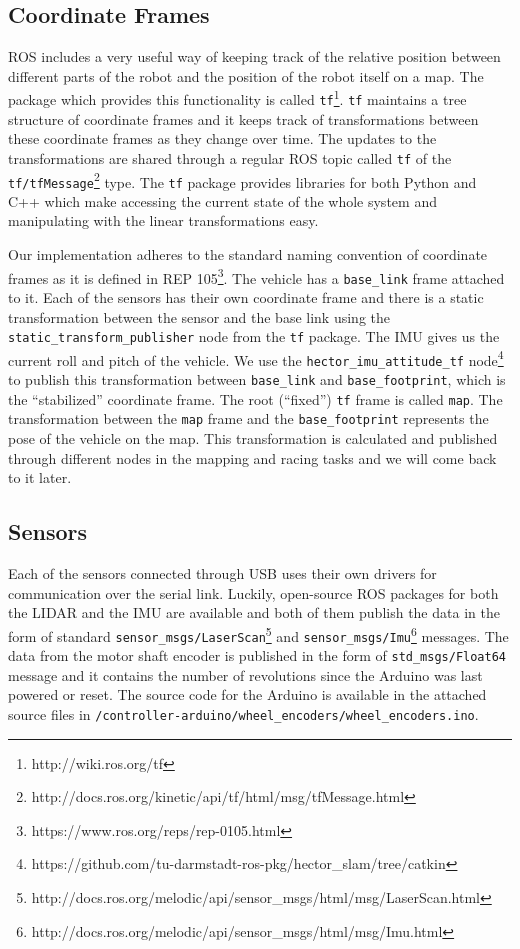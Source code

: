 \subsection{Coordinate Frames}

\Gls{ROS} includes a very useful way of keeping track of the relative position between different parts of the robot and the position of the robot itself on a map. The package which provides this functionality is called \verb|tf|\footnote{http://wiki.ros.org/tf}. \verb|tf| maintains a tree structure of coordinate frames and it keeps track of transformations between these coordinate frames as they change over time. The updates to the transformations are shared through a regular \gls*{ROS} topic called \verb|tf| of the \texttt{tf/tfMessage}\footnote{http://docs.ros.org/kinetic/api/tf/html/msg/tfMessage.html} type. The \verb|tf| package provides libraries for both Python and C++ which make accessing the current state of the whole system and manipulating with the linear transformations easy.

Our implementation adheres to the standard naming convention of coordinate frames as it is defined in \gls{REP} 105\footnote{https://www.ros.org/reps/rep-0105.html}. The vehicle has a \verb|base_link| frame attached to it. Each of the sensors has their own coordinate frame and there is a static transformation between the sensor and the base link using the \texttt{static\_\allowbreak transform\_\allowbreak publisher} node from the \verb|tf| package. The \gls*{IMU} gives us the current roll and pitch of the vehicle. We use the \texttt{hector\_imu\_attitude\_tf} node\footnote{https://github.com/tu-darmstadt-ros-pkg/hector\_slam/tree/catkin} to publish this transformation between \texttt{base\_link} and \texttt{base\_footprint}, which is the ``stabilized'' coordinate frame. The root (``fixed'') \verb|tf| frame is called \verb|map|. The transformation between the \verb|map| frame and the \verb|base_footprint| represents the pose of the vehicle on the map. This transformation is calculated and published through different nodes in the mapping and racing tasks and we will come back to it later.

\subsection{Sensors}

Each of the sensors connected through USB uses their own drivers for communication over the serial link. Luckily, open-source \gls*{ROS} packages for both the \gls*{LIDAR} and the \gls*{IMU} are available and both of them publish the data in the form of standard \verb|sensor_msgs/LaserScan|\footnote{http://docs.ros.org/melodic/api/sensor\_msgs/html/msg/LaserScan.html} and \verb|sensor_msgs/Imu|\footnote{http://docs.ros.org/melodic/api/sensor\_msgs/html/msg/Imu.html} messages. The data from the motor shaft encoder is published in the form of \verb|std_msgs/Float64| message and it contains the number of revolutions since the Arduino was last powered or reset. The source code for the Arduino is available in the attached source files in \verb|/controller-arduino/wheel_encoders/wheel_encoders.ino|.

